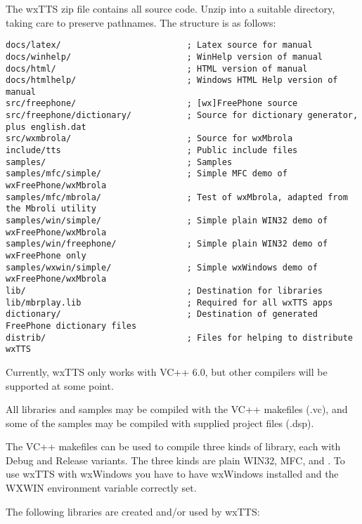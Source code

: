 The wxTTS zip file contains all source code. Unzip into a suitable directory,
taking care to preserve pathnames. The structure is as follows:

{\small\begin{verbatim}
docs/latex/                         ; Latex source for manual
docs/winhelp/                       ; WinHelp version of manual
docs/html/                          ; HTML version of manual
docs/htmlhelp/                      ; Windows HTML Help version of manual
src/freephone/                      ; [wx]FreePhone source
src/freephone/dictionary/           ; Source for dictionary generator, plus english.dat
src/wxmbrola/                       ; Source for wxMbrola
include/tts                         ; Public include files
samples/                            ; Samples
samples/mfc/simple/                 ; Simple MFC demo of wxFreePhone/wxMbrola
samples/mfc/mbrola/                 ; Test of wxMbrola, adapted from the Mbroli utility
samples/win/simple/                 ; Simple plain WIN32 demo of wxFreePhone/wxMbrola
samples/win/freephone/              ; Simple plain WIN32 demo of wxFreePhone only
samples/wxwin/simple/               ; Simple wxWindows demo of wxFreePhone/wxMbrola
lib/                                ; Destination for libraries
lib/mbrplay.lib                     ; Required for all wxTTS apps
dictionary/                         ; Destination of generated FreePhone dictionary files
distrib/                            ; Files for helping to distribute wxTTS
\end{verbatim}
}

Currently, wxTTS only works with VC++ 6.0, but other compilers will be supported at some point.

All libraries and samples may be compiled with the VC++ makefiles (.vc), and some
of the samples may be compiled with supplied project files (.dsp).

The VC++ makefiles can be used to compile three kinds of library, each with Debug and Release
variants. The three kinds are plain WIN32, MFC, and . To use wxTTS with wxWindows
you have to have wxWindows installed and the WXWIN environment variable correctly set.

The following libraries are created and/or used by wxTTS:

